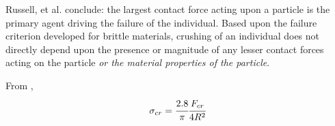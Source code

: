 Russell, et al. \cite{Russell2009} conclude: the largest contact force acting upon a particle is the primary agent driving the failure of the individual. Based upon the failure criterion developed for brittle materials, crushing of an individual does not directly depend upon the presence or magnitude of any lesser contact forces acting on the particle \emph{ or the material properties of the particle}.


From \cite{Pitchumani2004}, 
\begin{align*}
\sigma_{cr} = \cfrac{2.8}{\pi}\cfrac{F_{cr}}{4R^2}
\end{align*}



